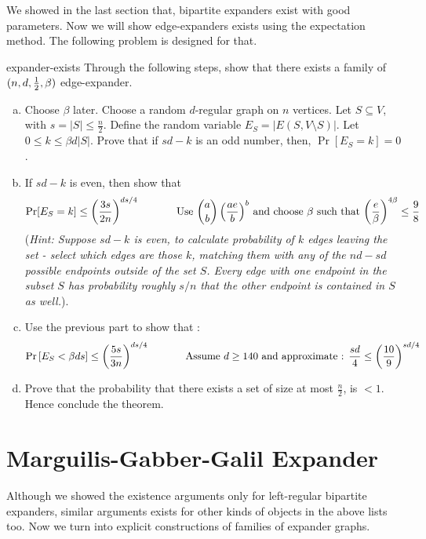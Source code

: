 We showed in the last section that, bipartite expanders exist with good parameters. Now we will show edge-expanders exists using the expectation method. The following problem is designed for that.

\begin{exercise-prob}
\begin{show-ps3}{expander-exists}
Through the following steps, show that there exists a family of $(n,d,\frac{1}{2},\beta)$ edge-expander.
\begin{enumerate}[(a)]
\item Choose $\beta$ later. Choose a random $d$-regular graph on $n$ vertices. Let $S \subseteq V$, with $s=|S| \le \frac{n}{2}$. Define the random variable $E_S = |E(S,V\setminus S)|$. Let $0 \le k \le \beta d |S|$. Prove that if $sd-k$ is an odd number, then, $\Pr[E_S = k] = 0$.
\item If $sd-k$ is even, then show that 
$$\Pr[E_S=k] \le \left(\frac{3s}{2n}\right)^{ds/4}
\textrm{ \hspace{1cm} Use ${a \choose b} \left( \frac{ae}{b}\right)^b$ and choose $\beta$ such that $\left(\frac{e}{\beta}\right)^{4\beta} \le \frac{9}{8}$} 
$$
(\textit{Hint: Suppose $sd-k$ is even, to calculate probability of $k$ edges leaving the set - select which edges are those $k$, matching them with any of the $nd-sd$ possible endpoints outside of the set $S$. Every edge with one endpoint in the subset $S$ has probability roughly $s/n$ that the other endpoint is contained in $S$ as well.}).
\item Use the previous part to show that :
$$ \Pr\left[E_S < \beta ds\right] \le \left(\frac{5s}{3n}\right)^{ds/4} \textrm{ \hspace{1cm} Assume $d \ge 140$ and approximate : $\frac{sd}{4} \le \left(\frac{10}{9}\right)^{sd/4}$}$$
\item Prove that the probability that there exists a set of size at most $\frac{n}{2}$, is $<1$. Hence conclude the theorem.
\end{enumerate}
\end{show-ps3}
\end{exercise-prob}

\section{Marguilis-Gabber-Galil Expander}

Although we showed the existence arguments only for left-regular bipartite expanders, similar arguments exists for other kinds of objects in the above lists too. Now we turn into explicit constructions of families of expander graphs.

